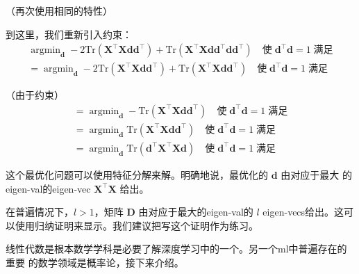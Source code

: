 （再次使用相同的特性）

到这里，我们重新引入约束：
\begin{gather}
  \mathop{\arg\min}_{\pmb{d}} -
  2\mathrm{Tr}(\pmb{X}^{\top}\pmb{X}\pmb{d}\pmb{d}^{\top}) +
  \mathrm{Tr}(\pmb{X}^{\top}\pmb{X}\pmb{d}\pmb{d}^{\top}\pmb{d}\pmb{d}^{\top})
  \quad\text{使}\;\pmb{d}^{\top}\pmb{d} = 1\;\text{满足}\\
  = \mathop{\arg\min}_{\pmb{d}} -
  2\mathrm{Tr}(\pmb{X}^{\top}\pmb{X}\pmb{d}\pmb{d}^{\top}) +
  \mathrm{Tr}(\pmb{X}^{\top}\pmb{X}\pmb{d}\pmb{d}^{\top})
  \quad\text{使}\;\pmb{d}^{\top}\pmb{d} = 1\;\text{满足}
\end{gather}

（由于约束）
\begin{gather}
  = \mathop{\arg\min}_{\pmb{d}} -
  \mathrm{Tr}(\pmb{X}^{\top}\pmb{X}\pmb{d}\pmb{d}^{\top})
  \quad\text{使}\;\pmb{d}^{\top}\pmb{d} = 1\;\text{满足}\\
  = \mathop{\arg\min}_{\pmb{d}} 
  \mathrm{Tr}(\pmb{X}^{\top}\pmb{X}\pmb{d}\pmb{d}^{\top})
  \quad\text{使}\;\pmb{d}^{\top}\pmb{d} = 1\;\text{满足}\\
  = \mathop{\arg\min}_{\pmb{d}} 
  \mathrm{Tr}(\pmb{d}^{\top}\pmb{X}^{\top}\pmb{X}\pmb{d})
  \quad\text{使}\;\pmb{d}^{\top}\pmb{d} = 1\;\text{满足}
\end{gather}

这个最优化问题可以使用特征分解来解。明确地说，最优化的 $\pmb{d}$ 由对应于最大
的\gls*{eigen-val}的\gls*{eigen-vec} $\pmb{X}^{\top}\pmb{X}$ 给出。

在普遍情况下，$l > 1$，矩阵 $\pmb{D}$ 由对应于最大的\gls*{eigen-val}的 $l$
\gls*{eigen-vecs}给出。这可以使用归纳证明来显示。我们建议把写这个证明作为练习。

线性代数是根本数学学科是必要了解深度学习中的一个。另一个\gls*{ml}中普遍存在的重要
的数学领域是概率论，接下来介绍。
